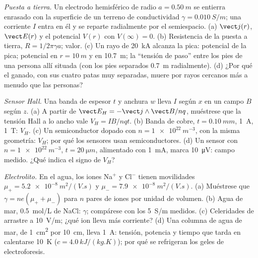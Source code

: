 \begin{exercise}[$\star\star\star$]\label{exo:b2:charges-currents-conduction:10}
\emph{Puesta a tierra.} Un electrodo hemisférico de radio $a = \qty{0.50}{m}$
se entierra enrasado con la superficie de un terreno de conductividad $\gamma =
\qty{0.010}{S/m}$; una corriente $I$ entra en él y se reparte radialmente
por el semiespacio. (a) $\vect j(r)$, $\vect E(r)$ y el potencial $V(r)$ con $V(\infty) = 0$.
(b) Resistencia de la puesta a tierra, $R = 1/2\pi\gamma a$; valor. (c) Un
rayo de \qty{20}{kA} alcanza la pica: potencial de la pica; potencial en
$r = \qty{10}{m}$ y en \qty{10.7}{m}; la ``tensión de paso'' entre los pies
de una persona allí situada (con los pies separados \qty{0.7}{m} radialmente).
(d) ¿Por qué el ganado, con sus cuatro patas muy separadas, muere por
rayos cercanos más a menudo que las personas?
\end{exercise}

\begin{exercise}[$\star\star\star$]\label{exo:b2:charges-currents-conduction:11}
\emph{Sensor Hall.} Una banda de espesor $t$ y anchura $w$ lleva $I$ según
$x$ en un campo $B$ según $z$. (a) A partir de $\vect E_H = -\vect j\wedge\vect B
/nq$, muéstrese que la tensión Hall a lo ancho vale $V_H = IB/nqt$. (b)
Banda de cobre, $t = \qty{0.10}{mm}$, \qty{1}{A}, \qty{1}{T}: $V_H$. (c) Un
semiconductor dopado con $n = \qty{1e22}{m^{-3}}$, con la misma geometría:
$V_H$; por qué los sensores usan semiconductores. (d) Un sensor con $n = \qty{1e22}{m^{-3}}$, $t =
\qty{20}{\micro m}$, alimentado con \qty{1}{mA}, marca \qty{10}{\micro V}: campo medido.
¿Qué indica el signo de $V_H$?
\end{exercise}

\begin{exercise}[$\star\star\star$]\label{exo:b2:charges-currents-conduction:12}
\emph{Electrolito.} En el agua, los iones Na$^+$ y Cl$^-$ tienen movilidades
$\mu_+ = \qty{5.2e-8}{m^2/(V.s)}$ y $\mu_- = \qty{7.9e-8}{m^2/(V.s)}$. (a)
Muéstrese que $\gamma = ne(\mu_+ + \mu_-)$ para $n$ pares de iones por unidad de volumen.
(b) Agua de mar, \qty{0.5}{mol/L} de NaCl: $\gamma$; compárese con los
\qty{5}{S/m} medidos. (c) Celeridades de arrastre a \qty{10}{V/m}; ¿qué ion
lleva más corriente? (d) Una columna de agua de mar, de \qty{1}{cm^2} por \qty{10}{cm}, lleva
\qty{1}{A}: tensión, potencia y tiempo que tarda en calentarse \qty{10}{K} ($c =
\qty{4.0}{kJ/(kg.K)}$); por qué se refrigeran los geles de electroforesis.
\end{exercise}

